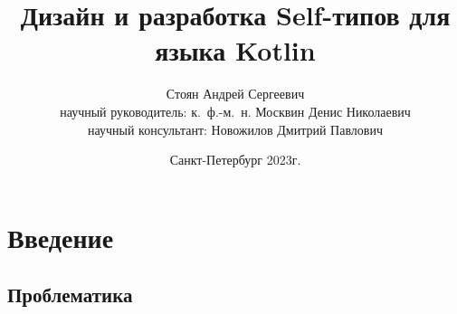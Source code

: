 \documentclass[handout,aspectratio=169,usenames,dvipsnames]{beamer}
\author[Андрей Стоян]{Стоян Андрей Сергеевич \\ {\footnotesize научный руководитель: к.~ф.-м.~н.} Москвин Денис Николаевич \\ {\footnotesize научный консультант:} Новожилов Дмитрий Павлович}
\institute[ИТМО/SE]{Университет ИТМО\\Разработка программного обеспечения/Software engineering}
\title[Дизайн и разработка Self-типов для языка Kotlin]{Дизайн и разработка Self-типов для языка Kotlin}
\date{Санкт-Петербург 2023г.}
\begin{document}
    \maketitle



    \section{Введение}


    \subsection{Проблематика}
\end{document}
